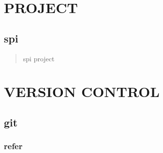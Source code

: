 \documentclass[a4paper,10pt,english]{sphinxmanual}
\begin{document}
\chapter{PROJECT}
\label{\detokenize{project/index:project}}\label{\detokenize{project/index::doc}}

\section{spi}
\label{\detokenize{project/spi:spi}}\label{\detokenize{project/spi::doc}}\begin{quote}

spi project
\end{quote}


\chapter{VERSION CONTROL}
\label{\detokenize{versionCtrl/index:version-control}}\label{\detokenize{versionCtrl/index::doc}}

\section{git}
\label{\detokenize{versionCtrl/git:git}}\label{\detokenize{versionCtrl/git::doc}}

\subsection{refer}
\label{\detokenize{versionCtrl/git:refer}}
\end{document}
